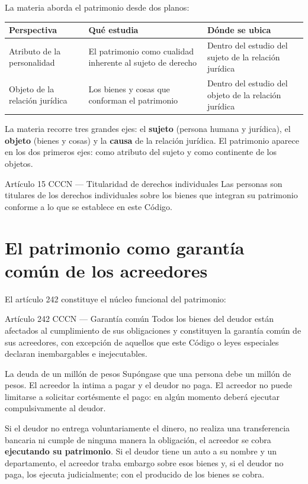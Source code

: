 \documentclass[12pt,oneside]{book}
\newenvironment{tabla}{%
    \par\medskip\begingroup\small\renewcommand{\arraystretch}{1.3}\noindent\ignorespaces
}{%
    \par\endgroup\medskip
}
\begin{document}
La materia aborda el patrimonio desde dos planos:

\begin{tabla}
\begin{tabularx}{\textwidth}{B{3.4cm}YY}
\toprule
Perspectiva & \textbf{Qué estudia} & \textbf{Dónde se ubica} \\
\midrule
Atributo de la personalidad & El patrimonio como cualidad inherente al sujeto de derecho & Dentro del estudio del sujeto de la relación jurídica \\
Objeto de la relación jurídica & Los bienes y cosas que conforman el patrimonio & Dentro del estudio del objeto de la relación jurídica \\
\bottomrule
\end{tabularx}
\end{tabla}

La materia recorre tres grandes ejes: el \textbf{sujeto} (persona humana y jurídica), el \textbf{objeto} (bienes y cosas) y la \textbf{causa} de la relación jurídica. El patrimonio aparece en los dos primeros ejes: como atributo del sujeto y como continente de los objetos.

\begin{norma}{Artículo 15 CCCN --- Titularidad de derechos individuales}
Las personas son titulares de los derechos individuales sobre los bienes que integran su patrimonio conforme a lo que se establece en este Código.
\end{norma}

\section{El patrimonio como garantía común de los acreedores}

El artículo 242 constituye el núcleo funcional del patrimonio:

\begin{norma}{Artículo 242 CCCN --- Garantía común}
Todos los bienes del deudor están afectados al cumplimiento de sus obligaciones y constituyen la garantía común de sus acreedores, con excepción de aquellos que este Código o leyes especiales declaran inembargables e inejecutables.
\end{norma}

\begin{example}{La deuda de un millón de pesos}
Supóngase que una persona debe un millón de pesos. El acreedor la intima a pagar y el deudor no paga. El acreedor no puede limitarse a solicitar cortésmente el pago: en algún momento deberá ejecutar compulsivamente al deudor.

Si el deudor no entrega voluntariamente el dinero, no realiza una transferencia bancaria ni cumple de ninguna manera la obligación, el acreedor se cobra \textbf{ejecutando su patrimonio}. Si el deudor tiene un auto a su nombre y un departamento, el acreedor traba embargo sobre esos bienes y, si el deudor no paga, los ejecuta judicialmente; con el producido de los bienes se cobra.
\end{example}
\end{document}
